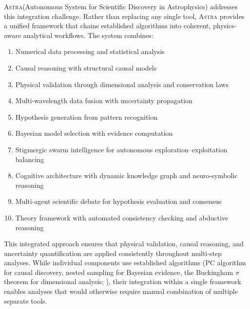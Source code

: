 \documentclass[usenatbib]{rasti}
\newcommand{\astra}{\textsc{Astra}\xspace}
\newcommand{\pc}{PC\xspace}
\begin{document}
\astra (Autonomous System for Scientific Discovery in Astrophysics) addresses this integration challenge.
Rather than replacing any single tool, \astra provides a unified framework that chains established algorithms into coherent, physics-aware analytical workflows.
The system combines:
\begin{enumerate}
  \item[(i)] Numerical data processing and statistical analysis
  \item[(ii)] Causal reasoning with structural causal models
  \item[(iii)] Physical validation through dimensional analysis and conservation laws
  \item[(iv)] Multi-wavelength data fusion with uncertainty propagation
  \item[(v)] Hypothesis generation from pattern recognition
  \item[(vi)] Bayesian model selection with evidence computation
  \item[(vii)] Stigmergic swarm intelligence for autonomous exploration--exploitation balancing
  \item[(viii)] Cognitive architecture with dynamic knowledge graph and neuro-symbolic reasoning
  \item[(ix)] Multi-agent scientific debate for hypothesis evaluation and consensus
  \item[(x)] Theory framework with automated consistency checking and abductive reasoning
\end{enumerate}

This integrated approach ensures that physical validation, causal reasoning, and uncertainty quantification are applied consistently throughout multi-step analyses.
While individual components use established algorithms (\pc algorithm for causal discovery, nested sampling for Bayesian evidence, the Buckingham $\pi$ theorem for dimensional analysis; \citealt{Buckingham1914}), their integration within a single framework enables analyses that would otherwise require manual combination of multiple separate tools.
\end{document}

